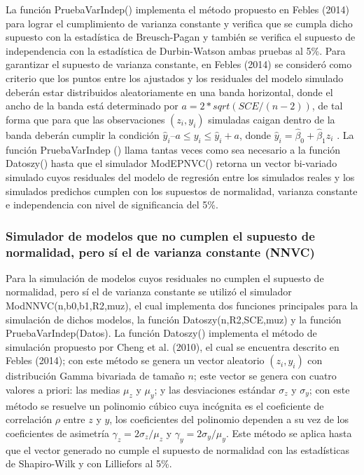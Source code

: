 La función PruebaVarIndep() implementa el método propuesto en Febles (2014) para lograr el cumplimiento de varianza constante y verifica que se cumpla dicho supuesto con la estadística de Breusch-Pagan y también se verifica el supuesto de independencia con la estadística de Durbin-Watson ambas pruebas al 5\%. Para garantizar el supuesto de varianza constante, en Febles (2014) se consideró como criterio que los puntos entre los ajustados y los residuales del modelo simulado deberán estar distribuidos aleatoriamente en una banda horizontal, donde el ancho de la banda está determinado por $a=2*sqrt(SCE/(n-2))$, de tal forma que para que las observaciones $(z_i, y_i)$ simuladas caigan dentro de la banda deberán cumplir la condición $\hat{y}_i – a \leq y_i \leq \hat{y}_i + a $, donde $\hat{y}_i=\hat{\beta}_0+\hat{\beta}_1 z_i$ . La función PruebaVarIndep () llama tantas veces como sea necesario a la función Datoszy() hasta que el simulador ModEPNVC()  retorna un vector bi-variado simulado cuyos residuales del modelo de regresión entre los simulados reales y los simulados predichos cumplen con los supuestos de normalidad, varianza constante e independencia con nivel de significancia del 5\%.\\ 

\subsubsection{Simulador de modelos que no cumplen el supuesto de normalidad, pero sí el de varianza constante (NNVC)}


Para la simulación de modelos cuyos residuales no cumplen el supuesto de normalidad, pero sí el de varianza constante se utilizó el simulador ModNNVC(n,b0,b1,R2,muz), el cual implementa dos funciones principales para la simulación de dichos modelos, la función Datoszy(n,R2,SCE,muz) y la función PruebaVarIndep(Datos). La función Datoszy() implementa el método de simulación propuesto por Cheng et al. (2010), el cual se encuentra descrito en Febles (2014); con este método se genera un vector aleatorio $(z_i, y_i)$ con distribución Gamma bivariada de tamaño $n$; este vector se genera con cuatro valores a priori: las medias $\mu_z$ y $\mu_y$; y las desviaciones estándar $\sigma_z$ y $\sigma_y$; con este método se resuelve un polinomio cúbico cuya incógnita es el coeficiente de correlación $\rho$ entre $z$ y $y$, los coeficientes del polinomio dependen a su vez de los coeficientes de asimetría $\gamma_z=2\sigma_z/ \mu_z$ y $\gamma_y=2\sigma_y/ \mu_y$. Este método se aplica hasta que el vector generado no cumple el supuesto de normalidad con las estadísticas de Shapiro-Wilk y con Lilliefors al 5\%.\\



